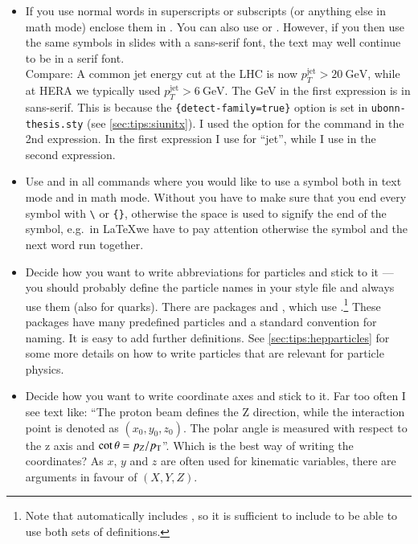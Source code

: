 \begin{itemize}
\item If you use normal words in superscripts or subscripts (or
  anything else in math mode) enclose them in . You can
  also use  or . However, if you then use
  the same symbols in slides with a sans-serif font, the text may well
  continue to be in a
  serif font.\\
  {\sffamily Compare: A common jet energy cut at the LHC is now
    \(p_{T}^{\text{jet}} > \SI{20}{\GeV}\), while at HERA we typically
    used \(p_{T}^{\mathrm{jet}} > \SI[detect-family=false]{6}{\GeV}\).
  }
  The \si{\GeV} in the first expression is in sans-serif. This is
  because the
  \texttt{\{detect-family=true\}}
  option is set in \texttt{ubonn-thesis.sty}
  (see \cref{sec:tips:siunitx}).  I used the option
  for the  command in the 2nd expression.
  In the first expression I use  for \enquote{jet}, while
  I use  in the second expression.

\item Use  and
   in all commands where you would
  like to use a symbol both in text mode and in math mode. Without
   you have to make sure that you end every symbol with
  \texttt{\textbackslash} or \texttt{\{\}}, otherwise the space is used
  to signify the end of the symbol, e.g.\ in \LaTeX we have to pay
  attention otherwise the symbol and the next word run together.

\item Decide how you want to write abbreviations for particles and
  stick to it --- you should probably define the particle names in your
  style file and always use them (also for quarks).
  There are packages  and ,
  which use .\footnote{%
    Note that  automatically includes ,
    so it is sufficient to include  to be able to use both sets of definitions.}
  These packages have many predefined particles and a standard convention for naming.
  It is easy to add further definitions.
  See \cref{sec:tips:hepparticles} for some more details on how to write particles
  that are relevant for particle physics.

\item Decide how you want to write coordinate axes
  and stick to it. Far too often I see text like: \enquote{The proton
    beam defines the Z direction, while the interaction point is
    denoted as \((x_{0}, y_{0}, z_{0})\). The polar angle is measured
    with respect to the z axis and \(\cot\theta = p_{Z}/p_{\text{T}}\)}. Which is
  the best way of writing the coordinates? As \(x\), \(y\) and \(z\) are
  often used for kinematic variables, there are arguments in favour of
  \((X, Y, Z)\).


\end{itemize}
